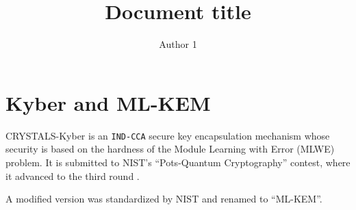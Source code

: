 \documentclass{article}
\title{
    Document title
}
\author{
    Author 1
}
\begin{document}
\maketitle

\section{Kyber and ML-KEM }
CRYSTALS-Kyber \cite{bos2018crystals} is an \texttt{IND-CCA} secure key encapsulation mechanism whose security is based on the hardness of the Module Learning with Error (MLWE) problem. It is submitted to NIST's ``Pots-Quantum Cryptography'' contest, where it advanced to the third round \cite{avanzi2019crystals}.

A modified version was standardized by NIST \cite{key2023mechanism} and renamed to ``ML-KEM''.

\kybercpapkekeygen
\kybercpapkeenc
\kybercpapkedec
\kyberccakemkeygen
\kyberccakemencap
\kyberccakemdecap





\end{document}
